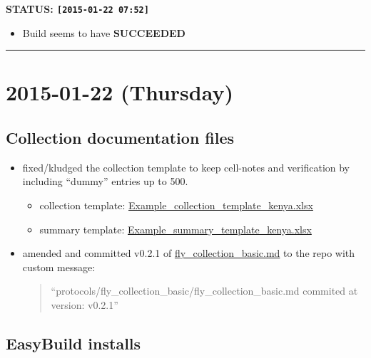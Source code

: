 \documentclass[letterpaper]{scrartcl}
\begin{document}
\textbf{STATUS: \texttt{{[}2015-01-22 07:52{]}}}

\begin{itemize}
\itemsep1pt\parskip0pt
\item
  Build seems to have \textbf{SUCCEEDED}
\end{itemize}

\begin{center}\rule{0.5\linewidth}{\linethickness}\end{center}

\section{2015-01-22 (Thursday)}\label{thursday-2}

\subsection{Collection documentation
files}\label{collection-documentation-files}

\begin{itemize}
\item
  fixed/kludged the collection template to keep cell-notes and
  verification by including ``dummy'' entries up to 500.

  \begin{itemize}
  \itemsep1pt\parskip0pt
  \item
    collection template:
    \href{file:///home/gus/Dropbox/uganda\%20data/collection_sheet_templates/Example_collection_template_kenya.xlsx}{Example\_collection\_template\_kenya.xlsx}
  \item
    summary template:
    \href{file:///home/gus/Dropbox/uganda\%20data/collection_sheet_templates/Example_summary_template_kenya.xlsx}{Example\_summary\_template\_kenya.xlsx}
  \end{itemize}
\item
  amended and committed v0.2.1 of
  \href{file:///home/gus/Dropbox/repos/git/markdown-docs/protocols/fly_collection_basic/fly_collection_basic.md}{fly\_collection\_basic.md}
  to the repo with custom message:

  \begin{quote}
  ``protocols/fly\_collection\_basic/fly\_collection\_basic.md commited
  at version: v0.2.1''
  \end{quote}
\end{itemize}

\subsection{EasyBuild installs}\label{easybuild-installs-1}
\end{document}
